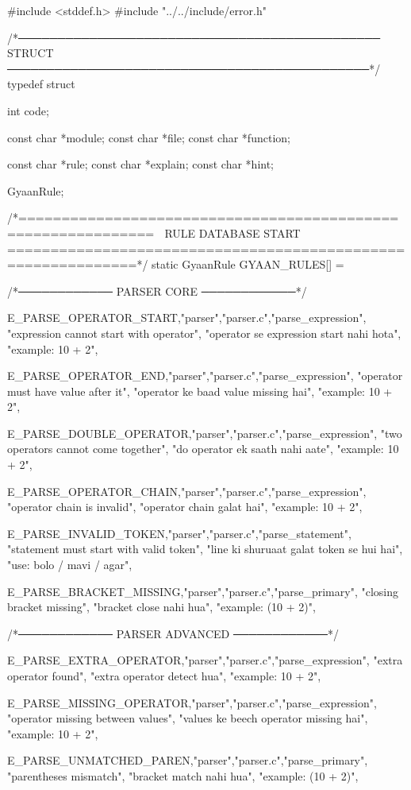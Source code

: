 \documentclass{article}
\begin{document}
#include <stddef.h>
#include "../../include/error.h"

/*──────────────────────────────────────────────
  STRUCT
──────────────────────────────────────────────*/
typedef struct {
    int code;

    const char *module;
    const char *file;
    const char *function;

    const char *rule;
    const char *explain;
    const char *hint;

} GyaanRule;

/*=============================================================
  🧠 RULE DATABASE START
=============================================================*/
static GyaanRule GYAAN_RULES[] = {

/*──────────── PARSER CORE ────────────*/

{E_PARSE_OPERATOR_START,"parser","parser.c","parse_expression",
"expression cannot start with operator",
"operator se expression start nahi hota",
"example: 10 + 2"},

{E_PARSE_OPERATOR_END,"parser","parser.c","parse_expression",
"operator must have value after it",
"operator ke baad value missing hai",
"example: 10 + 2"},

{E_PARSE_DOUBLE_OPERATOR,"parser","parser.c","parse_expression",
"two operators cannot come together",
"do operator ek saath nahi aate",
"example: 10 + 2"},

{E_PARSE_OPERATOR_CHAIN,"parser","parser.c","parse_expression",
"operator chain is invalid",
"operator chain galat hai",
"example: 10 + 2"},

{E_PARSE_INVALID_TOKEN,"parser","parser.c","parse_statement",
"statement must start with valid token",
"line ki shuruaat galat token se hui hai",
"use: bolo / mavi / agar"},

{E_PARSE_BRACKET_MISSING,"parser","parser.c","parse_primary",
"closing bracket missing",
"bracket close nahi hua",
"example: (10 + 2)"},

/*──────────── PARSER ADVANCED ────────────*/

{E_PARSE_EXTRA_OPERATOR,"parser","parser.c","parse_expression",
"extra operator found",
"extra operator detect hua",
"example: 10 + 2"},

{E_PARSE_MISSING_OPERATOR,"parser","parser.c","parse_expression",
"operator missing between values",
"values ke beech operator missing hai",
"example: 10 + 2"},

{E_PARSE_UNMATCHED_PAREN,"parser","parser.c","parse_primary",
"parentheses mismatch",
"bracket match nahi hua",
"example: (10 + 2)"},

}
\end{document}
